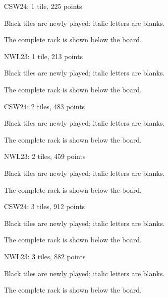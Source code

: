 \documentclass{article}
\begin{document}
\begin{center}
\large CSW24: 1 tile, 225 points\par\medskip

\par\medskip\normalsize Black tiles are newly played; italic letters are blanks.\par The complete rack is shown below the board.
\end{center}
\clearpage
\begin{center}
\large NWL23: 1 tile, 213 points\par\medskip

\par\medskip\normalsize Black tiles are newly played; italic letters are blanks.\par The complete rack is shown below the board.
\end{center}
\clearpage
\begin{center}
\large CSW24: 2 tiles, 483 points\par\medskip

\par\medskip\normalsize Black tiles are newly played; italic letters are blanks.\par The complete rack is shown below the board.
\end{center}
\clearpage
\begin{center}
\large NWL23: 2 tiles, 459 points\par\medskip

\par\medskip\normalsize Black tiles are newly played; italic letters are blanks.\par The complete rack is shown below the board.
\end{center}
\clearpage
\begin{center}
\large CSW24: 3 tiles, 912 points\par\medskip

\par\medskip\normalsize Black tiles are newly played; italic letters are blanks.\par The complete rack is shown below the board.
\end{center}
\clearpage
\begin{center}
\large NWL23: 3 tiles, 882 points\par\medskip

\par\medskip\normalsize Black tiles are newly played; italic letters are blanks.\par The complete rack is shown below the board.
\end{center}
\end{document}
